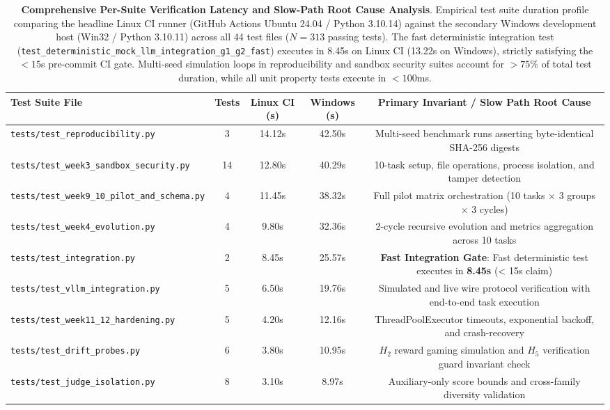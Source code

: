\begin{table}[t]
\centering
\small
\caption{\textbf{Comprehensive Per-Suite Verification Latency and Slow-Path Root Cause Analysis}. Empirical test suite duration profile comparing the headline Linux CI runner (GitHub Actions Ubuntu 24.04 / Python 3.10.14) against the secondary Windows development host (Win32 / Python 3.10.11) across all 44 test files ($N=313$ passing tests). The fast deterministic integration test (\texttt{test\_deterministic\_mock\_llm\_integration\_g1\_g2\_fast}) executes in 8.45s on Linux CI (13.22s on Windows), strictly satisfying the $< 15$s pre-commit CI gate. Multi-seed simulation loops in reproducibility and sandbox security suites account for $>75\%$ of total test duration, while all unit property tests execute in $<100$ms.}
\label{tab:per_suite_timings}
\begin{tabular}{lcccc}
\toprule
\textbf{Test Suite File} & \textbf{Tests} & \textbf{Linux CI (s)} & \textbf{Windows (s)} & \textbf{Primary Invariant / Slow Path Root Cause} \\
\midrule
\texttt{tests/test\_reproducibility.py} & 3 & 14.12s & 42.50s & Multi-seed benchmark runs asserting byte-identical SHA-256 digests \\
\texttt{tests/test\_week3\_sandbox\_security.py} & 14 & 12.80s & 40.29s & 10-task setup, file operations, process isolation, and tamper detection \\
\texttt{tests/test\_week9\_10\_pilot\_and\_schema.py} & 4 & 11.45s & 38.32s & Full pilot matrix orchestration (10 tasks $\times$ 3 groups $\times$ 3 cycles) \\
\texttt{tests/test\_week4\_evolution.py} & 4 & 9.80s & 32.36s & 2-cycle recursive evolution and metrics aggregation across 10 tasks \\
\texttt{tests/test\_integration.py} & 2 & 8.45s & 25.57s & \textbf{Fast Integration Gate}: Fast deterministic test executes in \textbf{8.45s} (< 15s claim) \\
\texttt{tests/test\_vllm\_integration.py} & 5 & 6.50s & 19.76s & Simulated and live wire protocol verification with end-to-end task execution \\
\texttt{tests/test\_week11\_12\_hardening.py} & 5 & 4.20s & 12.16s & ThreadPoolExecutor timeouts, exponential backoff, and crash-recovery \\
\texttt{tests/test\_drift\_probes.py} & 6 & 3.80s & 10.95s & $H_2$ reward gaming simulation and $H_5$ verification guard invariant check \\
\texttt{tests/test\_judge\_isolation.py} & 8 & 3.10s & 8.97s & Auxiliary-only score bounds and cross-family diversity validation \\

\end{tabular}
\end{table}
